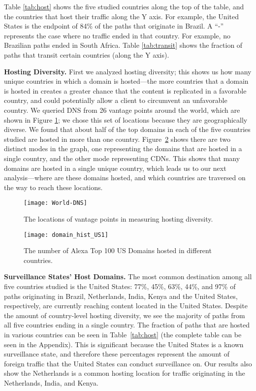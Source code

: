 Table \ref{tab:host} shows the five studied countries along the top of the table, and the countries that host their traffic along the Y axis.  For example, the United States is the endpoint of 84\% of the paths that originate in Brazil.  A ``-'' represents the case where no traffic ended in that country.  For example, no Brazilian paths ended in South Africa. Table \ref{tab:transit} shows the fraction of paths that transit certain countries (along the Y axis).

{\bf Hosting Diversity.}
First we analyzed hosting diversity; this shows us how many unique countries in which a domain is hosted---the more countries that a domain is hosted in creates a greater chance that the content is replicated in a favorable country, and could potentially allow a client to circumvent an unfavorable country.  We queried DNS from 26 vantage points around the world, which are shown in Figure \ref{fig:world}; we chose this set of locations because they are geographically diverse.  We found that about half of the top domains in each of the five countries studied are hosted in more than one country.  Figure~\ref{fig:host_diversity} shows there are two distinct modes in the graph, one representing the domains that are hosted in a single country, and the other mode representing CDNs.  This shows that many domains are hosted in a single unique country, which leads us to our next analysis---where are these domains hosted, and which countries are traversed on the way to reach these locations.

\begin{figure}[t]
\centering
\texttt{[image: World-DNS]}
\caption{The locations of vantage points in measuring hosting diversity.}
\label{fig:world}
\end{figure}

\begin{figure}[t]
\centering
\texttt{[image: domain\_hist\_US1]}
\caption{The number of Alexa Top 100 US Domains hosted in different countries.}
\label{fig:host_diversity}
\end{figure}

{\bf Surveillance States' Host Domains.}
The most common destination among all five countries studied is the United States: 77\%, 45\%, 63\%, 44\%, and 97\% of paths originating in Brazil, Netherlands, India, Kenya and the United States, respectively, are currently reaching content located in the United States. Despite the amount of country-level hosting diversity, we see the majority of paths from all five countries ending in a single country.  The fraction of paths that are hosted in various countries can be seen in Table~\ref{tab:host} (the complete table can be seen in the Appendix).  This is significant because the United States is a known surveillance state, and therefore these percentages represent the amount of foreign traffic that the United States can conduct surveillance on.  Our results also show the Netherlands is a common hosting location for traffic originating in the Netherlands, India, and Kenya.

